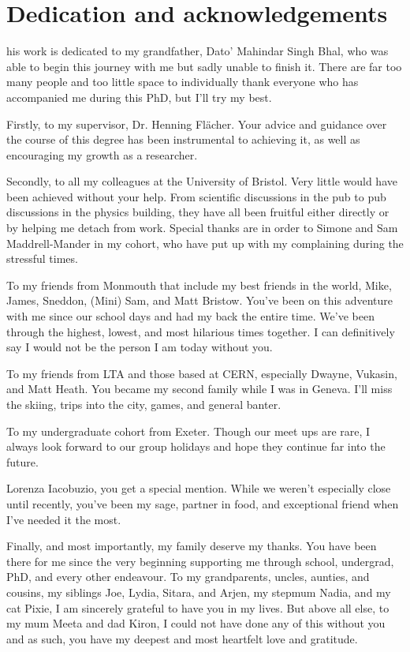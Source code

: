 %
%

\chapter*{Dedication and acknowledgements}
\begin{SingleSpace}
his work is dedicated to my grandfather, Dato' Mahindar Singh Bhal, who was able to begin this journey with me but sadly unable to finish it. There are far too many people and too little space to individually thank everyone who has accompanied me during this PhD, but I'll try my best.

Firstly, to my supervisor, Dr. Henning Fl\"{a}cher. Your advice and guidance over the course of this degree has been instrumental to achieving it, as well as encouraging my growth as a researcher.

Secondly, to all my colleagues at the University of Bristol. Very little would have been achieved without your help. From scientific discussions in the pub to pub discussions in the physics building, they have all been fruitful either directly or by helping me detach from work. Special thanks are in order to Simone and Sam Maddrell-Mander in my cohort, who have put up with my complaining during the stressful times.

To my friends from Monmouth that include my best friends in the world, Mike, James, Sneddon, (Mini) Sam, and Matt Bristow. You've been on this adventure with me since our school days and had my back the entire time. We've been through the highest, lowest, and most hilarious times together. I can definitively say I would not be the person I am today without you.

To my friends from LTA and those based at CERN, especially Dwayne, Vukasin, and Matt Heath. You became my second family while I was in Geneva. I'll miss the skiing, trips into the city, games, and general banter.

To my undergraduate cohort from Exeter. Though our meet ups are rare, I always look forward to our group holidays and hope they continue far into the future.

Lorenza Iacobuzio, you get a special mention. While we weren't especially close until recently, you've been my sage, partner in food, and exceptional friend when I've needed it the most.

Finally, and most importantly, my family deserve my thanks. You have been there for me since the very beginning supporting me through school, undergrad, PhD, and every other endeavour. To my grandparents, uncles, aunties, and cousins, my siblings Joe, Lydia, Sitara, and Arjen, my stepmum Nadia, and my cat Pixie, I am sincerely grateful to have you in my lives. But above all else, to my mum Meeta and dad Kiron, I could not have done any of this without you and as such, you have my deepest and most heartfelt love and gratitude.

\end{SingleSpace}
\clearpage
